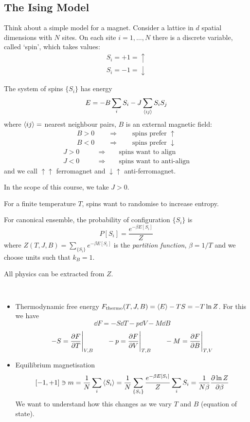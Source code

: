 \documentclass[a4paper,11pt]{article}
\begin{document}
	\subsection{The Ising Model}
	Think about a simple model for a magnet. Consider a lattice in $d$ spatial dimensions with $N$ sites. On each site $i = 1, \dots , N$ there is a discrete variable, called `spin', which takes values:
	\begin{align*}
		S_i = + 1 = \uparrow\\
		S_i = - 1 = \downarrow
	\end{align*}


	The system of spins $\{S_i\}$ has energy
	\[
		E = -B \sum_i S_i - J \sum_{\expval{ij}}S_i S_j
	\]
	where $\expval{ij} = $ nearest neighbour pairs, $B$ is an external magnetic field:
	\begin{align*}
		B>0 \qquad \Rightarrow\qquad \text{spins prefer }\uparrow\\
		B<0 \qquad \Rightarrow\qquad \text{spins prefer }\downarrow
	\end{align*}
	\begin{align*}
		J > 0 &\qquad \Rightarrow\qquad \text{spins want to align}\\
		J < 0 &\qquad \Rightarrow\qquad \text{spins want to anti-align}
	\end{align*}
	and we call $\uparrow\uparrow$ ferromagnet and $\downarrow\uparrow$ anti-ferromagnet.
	
	In the scope of this course, we take $J > 0$.

	For a finite temperature $T$, spins want to randomise to increase entropy.

	For canonical ensemble, the probability of configuration $\{S_i\}$ is 
	$$P[S_i] = \frac{e^{- \beta E[S_i]}}{Z}$$ 
	where $Z(T,J,B) = \sum_{\{S_i\}} e ^{-\beta E[S_i]}$ is the \emph{partition function}, $\beta = 1/T$ and we choose units such that $k_B = 1$.

	All physics can be extracted from $Z$.

	\begin{ex} \ 
		\begin{itemize}
			\item Thermodynamic free energy $F_{\text{thermo}}(T,J,B) = \expval{E} - TS = - T \ln Z$. For this we have 
			\[
				\dd{F} = -S \dd{T} - p \dd{V} - M \dd{B}
			\]
			\[
				-S = \pdv{F}{T}\Bigg|_{V,B} \qquad -p = \pdv{F}{V}\Bigg|_{T,B} \qquad - M = \pdv{F}{B}\Bigg|_{T,V}
			\]
			\item Equilibrium magnetisation \[
				[-1,+1] \ni m = \frac{1}{N}\sum_i \expval{S_i} = \frac{1}{N}\sum_{\{S_i\}} \frac{e^{-\beta E[S_i]}}{Z} \sum_i S_i = \frac{1}{N\beta} \pdv{\ln Z}{\beta}
			\]
			We want to understand how this changes as we vary $T$ and $B$ (equation of state).
		\end{itemize}
	\end{ex}
\end{document}
